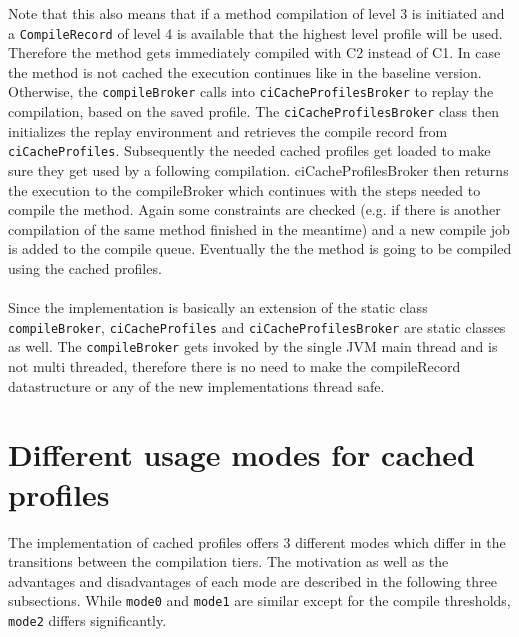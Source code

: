 Note that this also means that if a method compilation of level 3 is initiated and a \texttt{CompileRecord} of level 4 is available that the highest level profile will be used. Therefore the method gets immediately compiled with C2 instead of C1.
In case the method is not cached the execution continues like in the baseline version.
Otherwise, the \texttt{compileBroker} calls into \texttt{ciCacheProfilesBroker} to replay the compilation, based on the saved profile.
The \texttt{ciCacheProfilesBroker} class then initializes the replay environment and retrieves the compile record from \texttt{ciCacheProfiles}. Subsequently the needed cached profiles get loaded to make sure they get used by a following compilation. ciCacheProfilesBroker then returns the execution to the compileBroker which continues with the steps needed to compile the method. Again some constraints are checked (e.g. if there is another compilation of the same method finished in the meantime) and a new compile job is added to the compile queue. Eventually the the method is going to be compiled using the cached profiles.
\\\\
Since the implementation is basically an extension of the static class \texttt{compileBroker}, \texttt{ciCacheProfiles} and \texttt{ciCacheProfilesBroker} are static classes as well. The \texttt{compileBroker} gets invoked by the single JVM main thread and is not multi threaded, therefore there is no need to make the compileRecord datastructure or any of the new implementations thread safe. 

\section{Different usage modes for cached profiles}
The implementation of cached profiles offers 3 different modes which differ in the transitions between the compilation tiers.
The motivation as well as the advantages and disadvantages of each mode are described in the following three subsections.
While \texttt{mode0} and \texttt{mode1} are similar except for the compile thresholds, \texttt{mode2} differs significantly.

\label{s:cacheprofilesmode}
